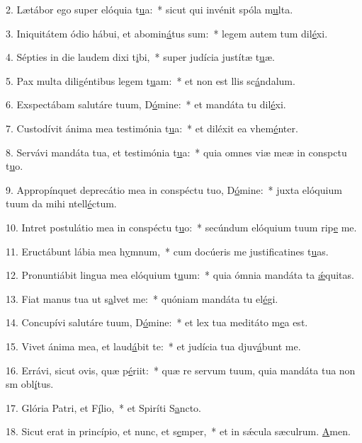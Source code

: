 2. Lætábor ego super elóquia t\uline{u}a:~* sicut qui invénit spóla m\uline{u}lta.\par 
3. Iniquitátem ódio hábui, et abomin\uline{á}tus sum:~* legem autem tum dil\uline{é}xi.\par 
4. Sépties in die laudem dixi t\uline{i}bi,~* super judícia justítæ t\uline{u}æ.\par 
5. Pax multa diligéntibus legem t\uline{u}am:~* et non est llis sc\uline{á}ndalum.\par 
6. Exspectábam salutáre tuum, D\uline{ó}mine:~* et mandáta tu dil\uline{é}xi.\par 
7. Custodívit ánima mea testimónia t\uline{u}a:~* et diléxit ea vhem\uline{é}nter.\par 
8. Servávi mandáta tua, et testimónia t\uline{u}a:~* quia omnes viæ meæ in conspctu t\uline{u}o.\par 
9. Appropínquet deprecátio mea in conspéctu tuo, D\uline{ó}mine:~* juxta elóquium tuum da mihi ntell\uline{é}ctum.\par 
10. Intret postulátio mea in conspéctu t\uline{u}o:~* secúndum elóquium tuum rip\uline{e} me.\par 
11. Eructábunt lábia mea h\uline{y}mnum,~* cum docúeris me justificatines t\uline{u}as.\par 
12. Pronuntiábit lingua mea elóquium t\uline{u}um:~* quia ómnia mandáta ta \uline{ǽ}quitas.\par 
13. Fiat manus tua ut s\uline{a}lvet me:~* quóniam mandáta tu el\uline{é}gi.\par 
14. Concupívi salutáre tuum, D\uline{ó}mine:~* et lex tua meditáto m\uline{e}a est.\par 
15. Vivet ánima mea, et laud\uline{á}bit te:~* et judícia tua djuv\uline{á}bunt me.\par 
16. Errávi, sicut ovis, quæ p\uline{é}riit:~* quæ re servum tuum, quia mandáta tua non sm obl\uline{í}tus.\par 
17. Glória Patri, et F\uline{í}lio,~* et Spiríti S\uline{a}ncto.\par 
18. Sicut erat in princípio, et nunc, et s\uline{e}mper,~* et in sǽcula sæculrum. \uline{A}men.\par 
